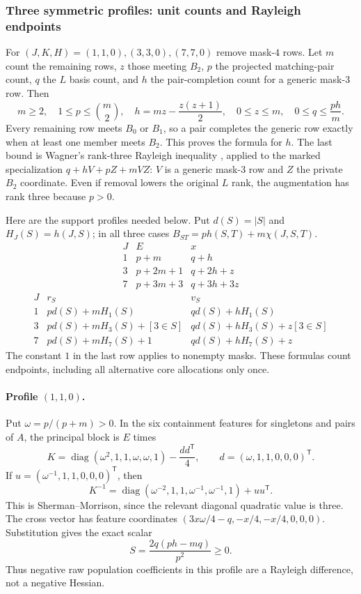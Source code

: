 \documentclass[11pt,a4paper]{article}
\theoremstyle{remark}\newtheorem{remark}[theorem]{Remark}
\newcommand{\diag}{\operatorname{diag}}    %
\begin{document}
\subsubsection{Three symmetric profiles: unit counts and Rayleigh endpoints}
\label{mrn:t:tn:bb:analytic}
For $(J,K,H)=(1,1,0),(3,3,0),(7,7,0)$ remove mask-$4$ rows.
Let $m$ count the remaining rows, $z$ those meeting $B_2$, $p$ the
projected matching-pair count, $q$ the $L$ basis count, and $h$ the
pair-completion count for a generic mask-$3$ row. Then
\begin{equation}\label{mrn:t:tn:bb:unitparameters}
 m\ge2,\quad 1\le p\le\binom m2,\quad
 h=mz-\frac{z(z+1)}2,\quad0\le z\le m,\quad
 0\le q\le\frac{ph}{m}.
\end{equation}
Every remaining row meets $B_0$ or $B_1$, so a pair completes the generic
row exactly when at least one member meets $B_2$. This proves the formula
for $h$. The last bound is Wagner's rank-three Rayleigh inequality
\cite{b:Wagner}, applied to the marked specialization
$q+hV+pZ+mVZ$: $V$ is a generic mask-$3$ row and $Z$ the private
$B_2$ coordinate. Even if removal lowers the original $L$ rank, the
augmentation has rank three because $p>0$.

Here are the support profiles needed below. Put $d(S)=|S|$ and
$H_J(S)=h(J,S)$; in all three cases
$B_{ST}=ph(S,T)+m\chi(J,S,T)$.
\[
\begin{array}{c|c|c}
J& E&x\\\hline
1&p+m&q+h\\
3&p+2m+1&q+2h+z\\
7&p+3m+3&q+3h+3z
\end{array}
\]
\[
\begin{array}{c|c|c}
J&r_S&v_S\\\hline
1&p d(S)+mH_1(S)&q d(S)+hH_1(S)\\
3&p d(S)+mH_3(S)+[3\in S]&q d(S)+hH_3(S)+z[3\in S]\\
7&p d(S)+mH_7(S)+1&q d(S)+hH_7(S)+z
\end{array}
\]
The constant $1$ in the last row applies to nonempty masks. These formulas
count endpoints, including all alternative core allocations only once.

\paragraph{Profile $(1,1,0)$.}
Put $\omega=p/(p+m)>0$. In the six containment features for singletons
and pairs of $A$, the principal block is $E$ times
\[
 K=\diag(\omega^2,1,1,\omega,\omega,1)-\frac{dd^{\mathsf T}}4,
 \qquad d=(\omega,1,1,0,0,0)^{\mathsf T}.
\]
If $u=(\omega^{-1},1,1,0,0,0)^{\mathsf T}$, then
\[
 K^{-1}=\diag(\omega^{-2},1,1,\omega^{-1},\omega^{-1},1)
                 +uu^{\mathsf T}.
\]
This is Sherman--Morrison, since the relevant diagonal quadratic value is
three. The cross vector has feature coordinates
$(3x\omega/4-q,-x/4,-x/4,0,0,0)$. Substitution gives the exact scalar
\begin{equation}\label{mrn:t:tn:bb:110}
 S=\frac{2q(ph-mq)}{p^2}\ge0.
\end{equation}
Thus negative raw population coefficients in this profile are a
Rayleigh difference, not a negative Hessian.
\end{document}
